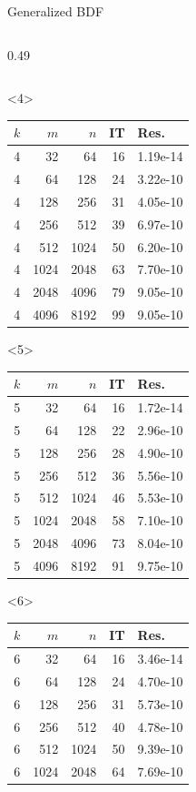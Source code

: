 \documentclass[aspectratio=169,xcolor=dvipsnames]{beamer}
\begin{document}
\begin{frame}[fragile]{Generalized BDF}
\begin{columns}
\begin{column}{0.49\columnwidth}
\begin{onlyenv}
\begin{tabular}{crrrl}
		\bottomrule
	\end{tabular}
\end{onlyenv}
\begin{onlyenv}<4>
	\begin{tabular}{crrrl}
		\toprule
		$k$ & $m$ & $n$ & IT & Res. \\
		\midrule
4 & 32 & 64 & 16 & 1.19e-14\\
4 & 64 & 128 & 24 & 3.22e-10\\
4 & 128 & 256 & 31 & 4.05e-10\\
4 & 256 & 512 & 39 & 6.97e-10\\
4 & 512 & 1024 & 50 & 6.20e-10\\
4 & 1024 & 2048 & 63 & 7.70e-10\\
4 & 2048 & 4096 & 79 & 9.05e-10\\
4 & 4096 & 8192 & 99 & 9.05e-10\\
		\bottomrule
	\end{tabular}
\end{onlyenv}
\begin{onlyenv}<5>
	\begin{tabular}{crrrl}
		\toprule
		$k$ & $m$ & $n$ & IT & Res. \\
		\midrule
5 & 32 & 64 & 16 & 1.72e-14\\
5 & 64 & 128 & 22 & 2.96e-10\\
5 & 128 & 256 & 28 & 4.90e-10\\
5 & 256 & 512 & 36 & 5.56e-10\\
5 & 512 & 1024 & 46 & 5.53e-10\\
5 & 1024 & 2048 & 58 & 7.10e-10\\
5 & 2048 & 4096 & 73 & 8.04e-10\\
5 & 4096 & 8192 & 91 & 9.75e-10\\
		\bottomrule
	\end{tabular}
\end{onlyenv}
\begin{onlyenv}<6>
	\begin{tabular}{crrrl}
		\toprule
		$k$ & $m$ & $n$ & IT & Res. \\
		\midrule
6 & 32 & 64 & 16 & 3.46e-14\\
6 & 64 & 128 & 24 & 4.70e-10\\
6 & 128 & 256 & 31 & 5.73e-10\\
6 & 256 & 512 & 40 & 4.78e-10\\
6 & 512 & 1024 & 50 & 9.39e-10\\
6 & 1024 & 2048 & 64 & 7.69e-10\\

\end{tabular}
\end{onlyenv}
\end{column}
\end{columns}
\end{frame}
\end{document}
